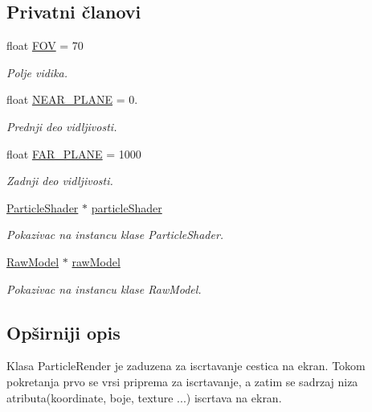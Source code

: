 \subsection*{Privatni članovi}
\begin{DoxyCompactItemize}
\item 
float \hyperlink{classparticle_1_1ParticleRenderer_ae161f09b14a97d3a7c77c3231f6ab58b}{F\+OV} = 70
\begin{DoxyCompactList}\small\item\em Polje vidika. \end{DoxyCompactList}\item 
float \hyperlink{classparticle_1_1ParticleRenderer_a4b6777a4deb2d8506356337a37bc320f}{N\+E\+A\+R\+\_\+\+P\+L\+A\+NE} = 0.
\begin{DoxyCompactList}\small\item\em Prednji deo vidljivosti. \end{DoxyCompactList}\item 
float \hyperlink{classparticle_1_1ParticleRenderer_a51d17d19a38ea21e75afc33a612e606d}{F\+A\+R\+\_\+\+P\+L\+A\+NE} = 1000
\begin{DoxyCompactList}\small\item\em Zadnji deo vidljivosti. \end{DoxyCompactList}\item 
\hyperlink{classshader_1_1ParticleShader}{Particle\+Shader} $\ast$ \hyperlink{classparticle_1_1ParticleRenderer_a6d60ff9e07886280f476e0bf579ead4e}{particle\+Shader}
\begin{DoxyCompactList}\small\item\em Pokazivac na instancu klase Particle\+Shader. \end{DoxyCompactList}\item 
\hyperlink{classmodel_1_1RawModel}{Raw\+Model} $\ast$ \hyperlink{classparticle_1_1ParticleRenderer_a75765f5960127cf6ea74e2c3afaeff13}{raw\+Model}
\begin{DoxyCompactList}\small\item\em Pokazivac na instancu klase Raw\+Model. \end{DoxyCompactList}\end{DoxyCompactItemize}


\subsection{Opširniji opis}
Klasa Particle\+Render je zaduzena za iscrtavanje cestica na ekran. Tokom pokretanja prvo se vrsi priprema za iscrtavanje, a zatim se sadrzaj niza atributa(koordinate, boje, texture ...) iscrtava na ekran. 

